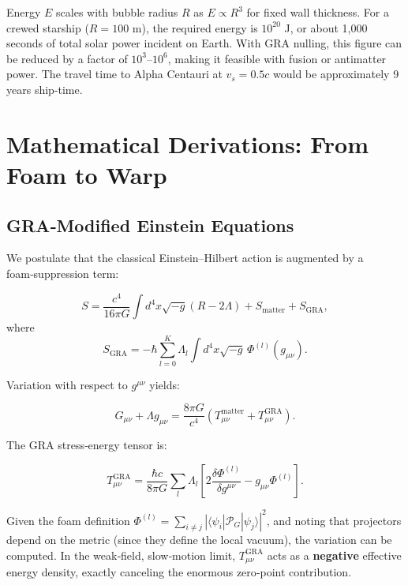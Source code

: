 \documentclass[11pt]{article}
\begin{document}
Energy $E$ scales with bubble radius $R$ as $E \propto R^3$ for fixed wall thickness. For a crewed starship ($R = 100$ m), the required energy is $10^{20}$ J, or about 1,000 seconds of total solar power incident on Earth. With GRA nulling, this figure can be reduced by a factor of $10^3$--$10^6$, making it feasible with fusion or antimatter power. The travel time to Alpha Centauri at $v_s = 0.5c$ would be approximately 9 years ship‑time.

\section{Mathematical Derivations: From Foam to Warp}

\subsection{GRA‑Modified Einstein Equations}

We postulate that the classical Einstein--Hilbert action is augmented by a foam‑suppression term:

\begin{equation}
S = \frac{c^4}{16\pi G} \int d^4x \sqrt{-g} (R - 2\Lambda) + S_{\text{matter}} + S_{\text{GRA}},
\label{eq:action}
\end{equation}
where
\begin{equation}
S_{\text{GRA}} = -\hbar \sum_{l=0}^K \Lambda_l \int d^4x \sqrt{-g} \, \Phi^{(l)}(g_{\mu\nu}).
\label{eq:GRA_action}
\end{equation}

Variation with respect to $g^{\mu\nu}$ yields:

\begin{equation}
G_{\mu\nu} + \Lambda g_{\mu\nu} = \frac{8\pi G}{c^4} \left( T_{\mu\nu}^{\text{matter}} + T_{\mu\nu}^{\text{GRA}} \right).
\label{eq:modified_einstein}
\end{equation}

The GRA stress‑energy tensor is:

\begin{equation}
T_{\mu\nu}^{\text{GRA}} = \frac{\hbar c}{8\pi G} \sum_l \Lambda_l \left[ 2 \frac{\delta \Phi^{(l)}}{\delta g^{\mu\nu}} - g_{\mu\nu} \Phi^{(l)} \right].
\label{eq:GRA_stress_energy}
\end{equation}

Given the foam definition $\Phi^{(l)} = \sum_{i \neq j} |\langle \psi_i | \mathcal{P}_G | \psi_j \rangle|^2$, and noting that projectors depend on the metric (since they define the local vacuum), the variation can be computed. In the weak‑field, slow‑motion limit, $T_{\mu\nu}^{\text{GRA}}$ acts as a \textbf{negative} effective energy density, exactly canceling the enormous zero‑point contribution.
\end{document}
